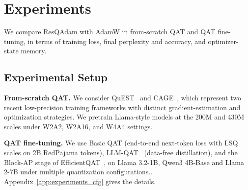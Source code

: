\documentclass{article} %
\begin{document}
\section{Experiments}
\label{sec:experiments}
We compare ResQAdam with AdamW in from-scratch QAT and QAT fine-tuning, in terms of training loss, final perplexity and accuracy, and optimizer-state memory.

\subsection{Experimental Setup}
\label{sec:exp_setup}
\textbf{From-scratch QAT.} 
We consider QuEST~\citep{panferov2025quest} and CAGE~\citep{tabesh2025cage}, which represent two recent low-precision training frameworks with distinct gradient-estimation and optimization strategies. We pretrain Llama-style models at the 200M and 430M scales under W2A2, W2A16, and W4A4 settings.

\textbf{QAT fine-tuning.} 
We use Basic QAT (end-to-end next-token loss with LSQ scales on 2B RedPajama tokens), LLM-QAT~\citep{liu2024llmqat} (data-free distillation), and the Block-AP stage of EfficientQAT~\citep{chen2025efficientqat}, on Llama 3.2-1B, Qwen3 4B-Base and Llama 2-7B under multiple quantization configurations.. Appendix~\ref{app:experiments_cfg} gives the details.
\end{document}
